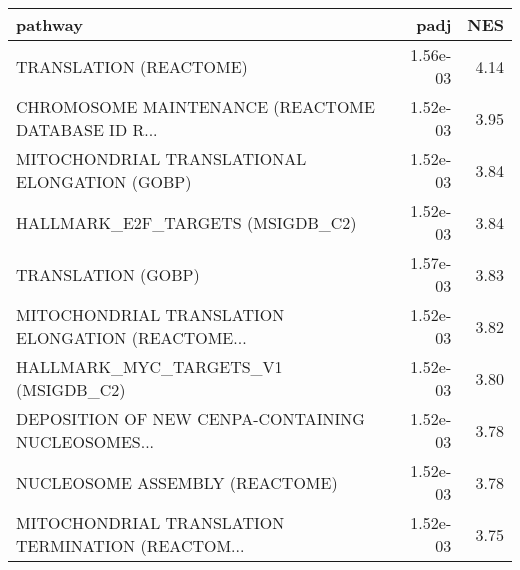 \begin{tabular}{lrr}
\toprule
                                           pathway &      padj &   NES \\
\midrule
                            TRANSLATION (REACTOME) &  1.56e-03 &  4.14 \\
 CHROMOSOME MAINTENANCE (REACTOME DATABASE ID R... &  1.52e-03 &  3.95 \\
     MITOCHONDRIAL TRANSLATIONAL ELONGATION (GOBP) &  1.52e-03 &  3.84 \\
                  HALLMARK\_E2F\_TARGETS (MSIGDB\_C2) &  1.52e-03 &  3.84 \\
                                TRANSLATION (GOBP) &  1.57e-03 &  3.83 \\
 MITOCHONDRIAL TRANSLATION ELONGATION (REACTOME... &  1.52e-03 &  3.82 \\
               HALLMARK\_MYC\_TARGETS\_V1 (MSIGDB\_C2) &  1.52e-03 &  3.80 \\
 DEPOSITION OF NEW CENPA-CONTAINING NUCLEOSOMES... &  1.52e-03 &  3.78 \\
                    NUCLEOSOME ASSEMBLY (REACTOME) &  1.52e-03 &  3.78 \\
 MITOCHONDRIAL TRANSLATION TERMINATION (REACTOM... &  1.52e-03 &  3.75 \\
\bottomrule
\end{tabular}
